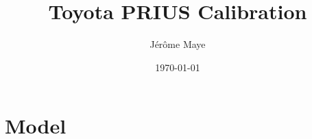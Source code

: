 \documentclass[12pt]{article}
\title{Toyota PRIUS Calibration}
\author{J\'{e}r\^{o}me Maye}
\date{\today}
\begin{document}
  \maketitle
  \section{Model}\label{sec:model}
\end{document}
